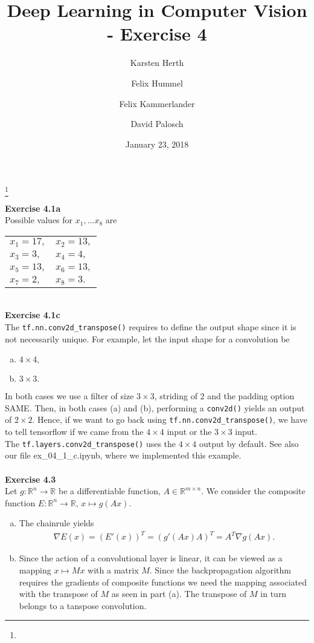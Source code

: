 \documentclass[a4paper, reqno]{amsart}
\newcommand{\R}{\mathbb R}
\theoremstyle{definition}
\numberwithin{equation}{section}
\begin{document}
\title[Exercise 4]
{Deep Learning in Computer Vision - Exercise 4}
\author{Karsten Herth}
\author{Felix Hummel}
\author{Felix Kammerlander}
\author{David Palosch}
\thanks{}
\date{January 23, 2018}

\maketitle

{\bf Exercise 4.1a} \\
Possible values for $x_1, \ldots x_8$  are 
\begin{center}
\begin{tabular}{ll}
$x_1 = 17,$ & $x_2 = 13,$ \\
$x_3 = 3,$ & $x_4 = 4,$ \\
$x_5 = 13,$ & $x_6 = 13,$ \\
$x_7 = 2,$ & $x_8 = 3.$
\end{tabular}
\end{center} ~\\

{\bf Exercise 4.1c} \\	The \texttt{tf.nn.conv2d_transpose()} requires to define the output shape since it is not necessarily unique. For example, let the input shape for a convolution be
	\begin{enumerate}
	[(a)]
		\item $4 \times 4,$
		\item $3 \times 3.$
	\end{enumerate}
	In both cases we use a filter of size $3 \times 3$, striding of $2$ and the padding option SAME. Then, in both cases (a) and (b), performing a \texttt{conv2d()} yields
	an output of $2 \times 2.$ Hence, if we want to go back using \texttt{tf.nn.conv2d_transpose()}, we have to tell tensorflow if we came from the $4 \times 4$ input or the
	$3 \times 3$ input. \\
	The \texttt{tf.layers.conv2d_transpose()} uses the $4 \times 4$ output by default. See also our file ex_04_1_c.ipynb, where we implemented this example. \\ \\

{\bf Exercise 4.3} \\
Let $g:\R^n \to \R$ be a differentiable function, $A\in \R^{m\times n}$. We consider the composite function $E:\R^n \to \R$, $x\mapsto g(Ax)$.
\begin{enumerate}[(a)]
\item The chainrule yields
\begin{align*}
\nabla E(x) = (E'(x))^T = (g'(Ax)A)^T = A^T \nabla g(Ax).
\end{align*}
\item Since the action of a convolutional layer is linear, it can be viewed as a mapping $x\mapsto Mx$ with a matrix $M$. Since the backpropagation algorithm requires the gradients of composite functions we need the mapping associated with the transpose of $M$ as seen in part (a). The transpose of $M$ in turn belongs to a tanspose convolution.
\end{enumerate}
\end{document}
